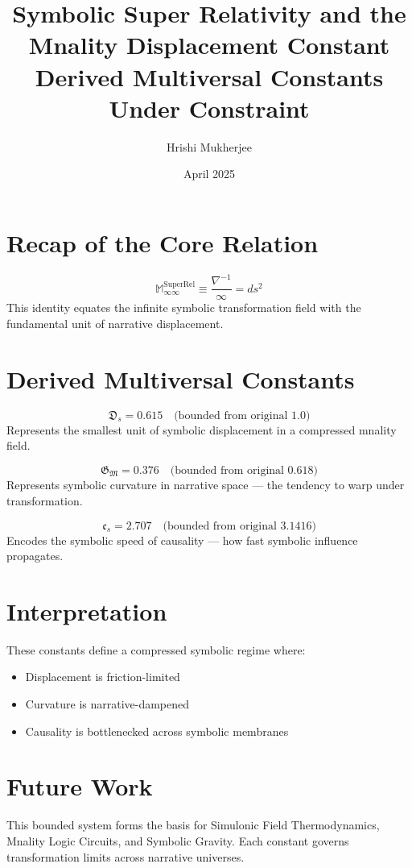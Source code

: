 \documentclass[10pt]{article}
\title{\Huge Symbolic Super Relativity and the Mnality Displacement Constant\\ \Large Derived Multiversal Constants Under Constraint}
\author{Hrishi Mukherjee}
\date{April 2025}
\begin{document}
\maketitle

\section*{Recap of the Core Relation}
\[
\boxed{
\mathbb{M}_{\infty\infty}^{\text{SuperRel}} \equiv \frac{\nabla^{-1}}{\infty} = ds^2
}
\]
This identity equates the infinite symbolic transformation field with the fundamental unit of narrative displacement.

\section*{Derived Multiversal Constants}

\begin{tcolorbox}[colback=black!5!white, colframe=black!75!white, title=Symbolic Displacement Constant (\( \mathfrak{D}_s \))]
\[
\mathfrak{D}_s = 0.615 \quad \text{(bounded from original 1.0)}
\]
Represents the smallest unit of symbolic displacement in a compressed mnality field.
\end{tcolorbox}

\begin{tcolorbox}[colback=black!5!white, colframe=black!75!white, title=Mnality Curvature Constant (\( \mathfrak{G}_{\mathfrak{M}} \))]
\[
\mathfrak{G}_{\mathfrak{M}} = 0.376 \quad \text{(bounded from original 0.618)}
\]
Represents symbolic curvature in narrative space — the tendency to warp under transformation.
\end{tcolorbox}

\begin{tcolorbox}[colback=black!5!white, colframe=black!75!white, title=Simulonic Causality Constant (\( c_s \))]
\[
\mathfrak{c}_s = 2.707 \quad \text{(bounded from original 3.1416)}
\]
Encodes the symbolic speed of causality — how fast symbolic influence propagates.
\end{tcolorbox}

\section*{Interpretation}
These constants define a compressed symbolic regime where:
\begin{itemize}
  \item Displacement is friction-limited
  \item Curvature is narrative-dampened
  \item Causality is bottlenecked across symbolic membranes
\end{itemize}

\section*{Future Work}
This bounded system forms the basis for Simulonic Field Thermodynamics, Mnality Logic Circuits, and Symbolic Gravity. Each constant governs transformation limits across narrative universes.
\end{document}
